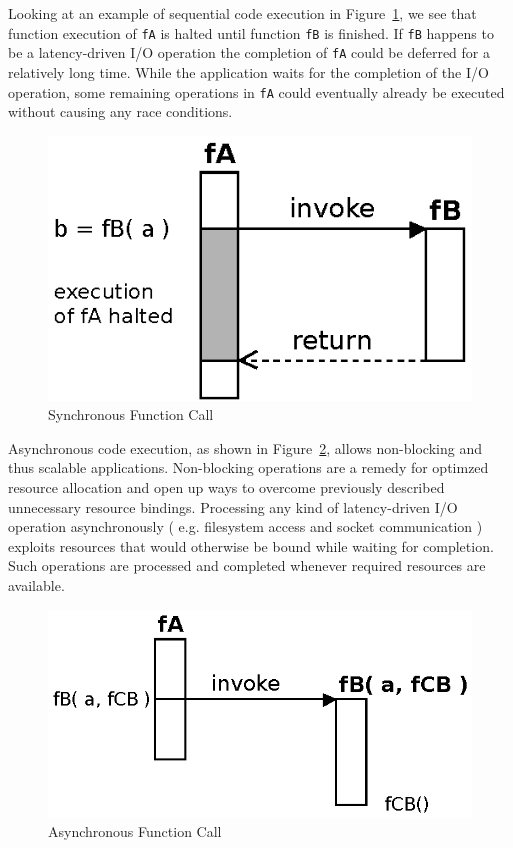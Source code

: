Looking at an example of sequential code execution in Figure~\ref{fig:Closures_Synchronous}, we see that function execution of \texttt{fA} is halted until function \texttt{fB} is finished.
If \texttt{fB} happens to be a latency-driven I/O operation the completion of \texttt{fA} could be deferred for a relatively long time.
While the application waits for the completion of the I/O operation, some remaining operations in \texttt{fA} could eventually already be executed without causing any race conditions.
\begin{figure}[!ht]
	\centering
  \includegraphics{figures/Closures_Synchronous}
	\caption{Synchronous Function Call}
	\label{fig:Closures_Synchronous}
\end{figure}


Asynchronous code execution, as shown in Figure~\ref{fig:Closures_Asynchronous}, allows non-blocking and thus scalable applications.
Non-blocking operations are a remedy for optimzed resource allocation and open up ways to overcome previously described unnecessary resource bindings.
Processing any kind of latency-driven I/O operation asynchronously ( e.g. filesystem access and socket communication ) exploits resources that would otherwise be bound while waiting for completion.
Such operations are processed and completed whenever required resources are available.
\begin{figure}[!ht]
	\centering
  \includegraphics{figures/Closures_Asynchronous}
	\caption{Asynchronous Function Call}
	\label{fig:Closures_Asynchronous}
\end{figure}


